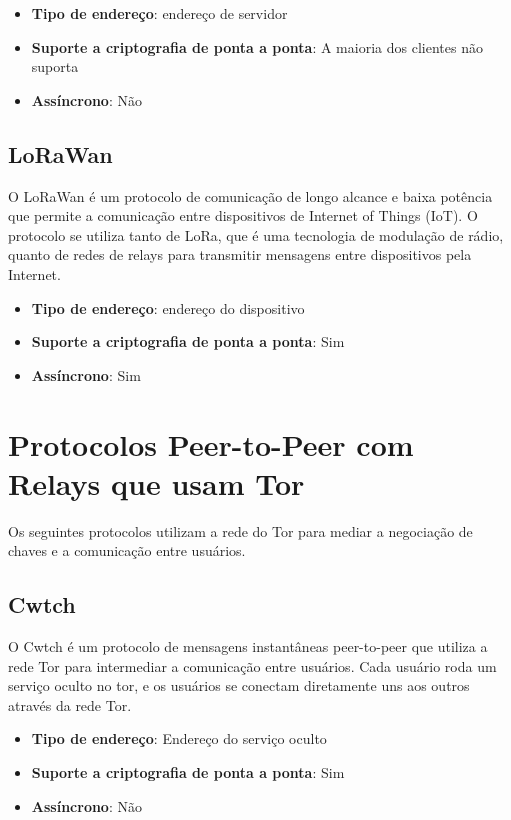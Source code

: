 \begin{itemize}
  \item \textbf{Tipo de endereço}: endereço de servidor
  \item \textbf{Suporte a criptografia de ponta a ponta}: A maioria dos clientes não suporta
  \item \textbf{Assíncrono}: Não
\end{itemize}

\subsection{LoRaWan}

O LoRaWan é um protocolo de comunicação de longo alcance e baixa potência que permite a comunicação entre dispositivos de Internet of Things (IoT). O protocolo se utiliza tanto de LoRa, que é uma tecnologia de modulação de rádio, quanto de redes de relays para transmitir mensagens entre dispositivos pela Internet. \cite{lorawan}

\begin{itemize}
  \item \textbf{Tipo de endereço}: endereço do dispositivo
  \item \textbf{Suporte a criptografia de ponta a ponta}: Sim
  \item \textbf{Assíncrono}: Sim
\end{itemize}

\section{Protocolos Peer-to-Peer com Relays que usam Tor}

Os seguintes protocolos utilizam a rede do Tor para mediar a negociação de chaves e a comunicação entre usuários.

\subsection{Cwtch}

O Cwtch é um protocolo de mensagens instantâneas peer-to-peer que utiliza a rede Tor para intermediar a comunicação entre usuários. Cada usuário roda um serviço oculto no tor, e os usuários se conectam diretamente uns aos outros através da rede Tor. \cite{cwtch}

\begin{itemize}
  \item \textbf{Tipo de endereço}: Endereço do serviço oculto
  \item \textbf{Suporte a criptografia de ponta a ponta}: Sim
  \item \textbf{Assíncrono}: Não
\end{itemize}

